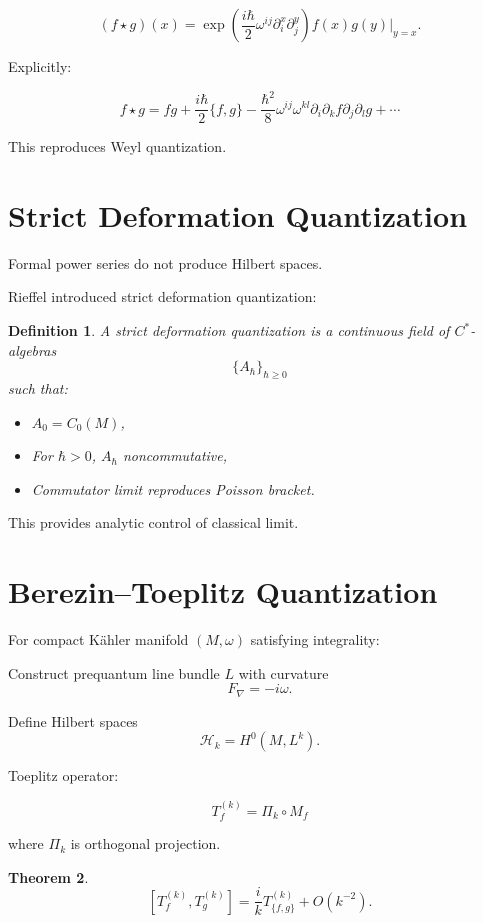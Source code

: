 \documentclass[11pt]{book}
\newtheorem{theorem}{Theorem}[chapter]
\newtheorem{definition}[theorem]{Definition}
\begin{document}
\[
(f \star g)(x)
=
\exp\!\left(
\frac{i\hbar}{2}\omega^{ij}\partial_i^x \partial_j^y
\right)
f(x)g(y)\big|_{y=x}.
\]

Explicitly:

\[
f \star g
=
fg
+
\frac{i\hbar}{2}\{f,g\}
-
\frac{\hbar^2}{8}\omega^{ij}\omega^{kl}
\partial_i\partial_k f
\partial_j\partial_l g
+\cdots
\]

This reproduces Weyl quantization.

\section{Strict Deformation Quantization}

Formal power series do not produce Hilbert spaces.

Rieffel introduced strict deformation quantization:

\begin{definition}
A strict deformation quantization is a continuous field of $C^*$-algebras
\[
\{A_\hbar\}_{\hbar \ge 0}
\]
such that:
\begin{itemize}
\item $A_0 = C_0(M)$,
\item For $\hbar>0$, $A_\hbar$ noncommutative,
\item Commutator limit reproduces Poisson bracket.
\end{itemize}
\end{definition}

This provides analytic control of classical limit.

\section{Berezin--Toeplitz Quantization}

For compact Kähler manifold $(M,\omega)$ satisfying integrality:

Construct prequantum line bundle $L$ with curvature
\[
F_\nabla = -i\omega.
\]

Define Hilbert spaces
\[
\mathcal{H}_k = H^0(M, L^k).
\]

Toeplitz operator:

\[
T_f^{(k)} = \Pi_k \circ M_f
\]

where $\Pi_k$ is orthogonal projection.

\begin{theorem}
\[
[T_f^{(k)},T_g^{(k)}]
=
\frac{i}{k} T_{\{f,g\}}^{(k)} + O(k^{-2}).
\]
\end{theorem}
\end{document}
